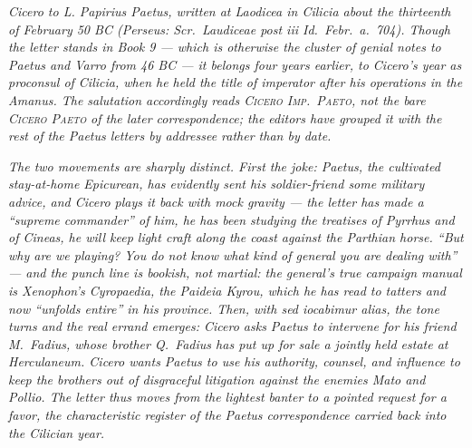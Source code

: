 
\textit{Cicero to L. Papirius Paetus, written at Laodicea in
Cilicia about the thirteenth of February 50 BC (Perseus:
\textit{Scr.~Laudiceae post iii Id.~Febr.~a.~704}). Though the
letter stands in Book 9 --- which is otherwise the cluster of
genial notes to Paetus and Varro from 46 BC --- it belongs four
years earlier, to Cicero's year as proconsul of Cilicia, when he
held the title of imperator after his operations in the Amanus.
The salutation accordingly reads \textsc{Cicero Imp.~Paeto}, not
the bare \textsc{Cicero Paeto} of the later correspondence; the
editors have grouped it with the rest of the Paetus letters by
addressee rather than by date.}

\textit{The two movements are sharply distinct. First the joke:
Paetus, the cultivated stay-at-home Epicurean, has evidently sent
his soldier-friend some military advice, and Cicero plays it back
with mock gravity --- the letter has made a ``supreme commander''
of him, he has been studying the treatises of Pyrrhus and of
Cineas, he will keep light craft along the coast against the
Parthian horse. ``But why are we playing? You do not know what
kind of general you are dealing with'' --- and the punch line is
bookish, not martial: the general's true campaign manual is
Xenophon's Cyropaedia, the \textit{Paideia Kyrou}, which he has
read to tatters and now ``unfolds entire'' in his province. Then,
with \textit{sed iocabimur alias}, the tone turns and the real
errand emerges: Cicero asks Paetus to intervene for his friend
M.~Fadius, whose brother Q.~Fadius has put up for sale a jointly
held estate at Herculaneum. Cicero wants Paetus to use his
authority, counsel, and influence to keep the brothers out of
disgraceful litigation against the enemies Mato and Pollio. The
letter thus moves from the lightest banter to a pointed request
for a favor, the characteristic register of the Paetus
correspondence carried back into the Cilician year.}
